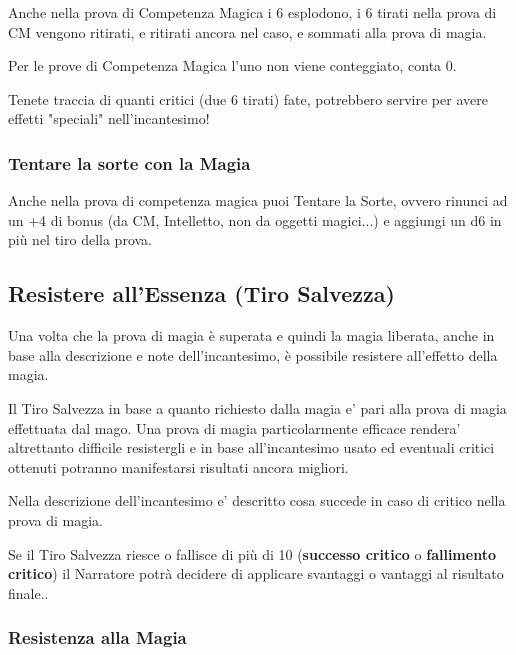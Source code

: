 \begin{multicols}{2}
\label{lesplosione-del-6-nella-magia}

Anche nella prova di Competenza Magica i 6 esplodono, i 6 tirati nella prova di CM vengono ritirati, e ritirati ancora nel caso, e sommati alla prova di magia.

Per le prove di Competenza Magica l'uno non viene conteggiato, conta 0.

Tenete traccia di quanti critici (due 6 tirati) fate, potrebbero servire per avere effetti "speciali" nell'incantesimo!

\subsubsection{Tentare la sorte con la Magia}

\label{tentare-la-sorte-con-la-magia}

Anche nella prova di competenza magica puoi Tentare la Sorte, ovvero rinunci ad un +4 di bonus (da CM, Intelletto, non da oggetti magici...) e aggiungi un d6 in più nel tiro della prova.

\subsection{Resistere all'Essenza (Tiro Salvezza)}

\label{resistere-allessenza-tiro-salvezza}

Una volta che la prova di magia è superata e quindi la magia liberata, anche in base alla descrizione e note dell'incantesimo, è possibile resistere all'effetto della magia.

Il Tiro Salvezza in base a quanto richiesto dalla magia e' pari alla prova di magia effettuata dal mago. Una prova di magia particolarmente efficace rendera' altrettanto difficile resistergli e in base all'incantesimo usato ed eventuali critici ottenuti potranno manifestarsi risultati ancora migliori.

Nella descrizione dell'incantesimo e' descritto cosa succede in caso di critico nella prova di magia.

Se il Tiro Salvezza riesce o fallisce di più di 10 (\textbf{successo critico} o \textbf{fallimento critico}) il Narratore potrà decidere di applicare svantaggi o vantaggi al risultato finale..

\subsubsection{Resistenza alla Magia}


\end{multicols}
